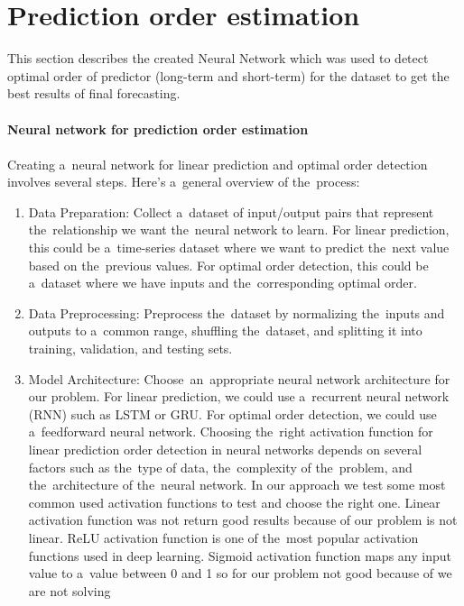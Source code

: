     \section{Prediction order estimation}\label{sec:ordercalc}
        This section describes the created Neural Network which was used to detect optimal
        order of predictor (long-term and short-term) for the dataset to get the best results
        of final forecasting.\\
        \\
        \textbf{Neural network for prediction order estimation}\\
        \\
        Creating a~neural network for linear prediction and optimal order detection involves several steps.
        Here's a~general overview of the~process:
        \begin{enumerate}
            \item Data Preparation: Collect a~dataset of input/output pairs that represent the~relationship we want
            the~neural network to learn. For linear prediction, this could be a~time-series dataset where we want to
            predict the~next value based on the~previous values. For optimal order detection, this could be a~dataset
            where we have inputs and the~corresponding optimal order.
            \item Data Preprocessing: Preprocess the~dataset by normalizing the~inputs and outputs to a~common range,
            shuffling the~dataset, and splitting it into training, validation, and testing sets.
            \item Model Architecture: Choose~an~appropriate neural network architecture for our problem. For linear
            prediction, we could use a~recurrent neural network (RNN) such as LSTM or GRU. For optimal order
            detection, we could use a~feedforward neural network. Choosing the~right activation function for linear
            prediction order detection in neural networks depends on
            several factors such as the~type of data, the~complexity of the~problem, and the~architecture of the~neural
            network. In our approach we test some most common used activation functions to test and choose the right one.
            Linear activation function was not return good results because of our problem is not linear. ReLU activation
            function is one of the~most popular activation functions used in deep learning. Sigmoid activation function
            maps any input value to a~value between 0 and 1 so for our problem not good because of we are not solving

\end{enumerate}
